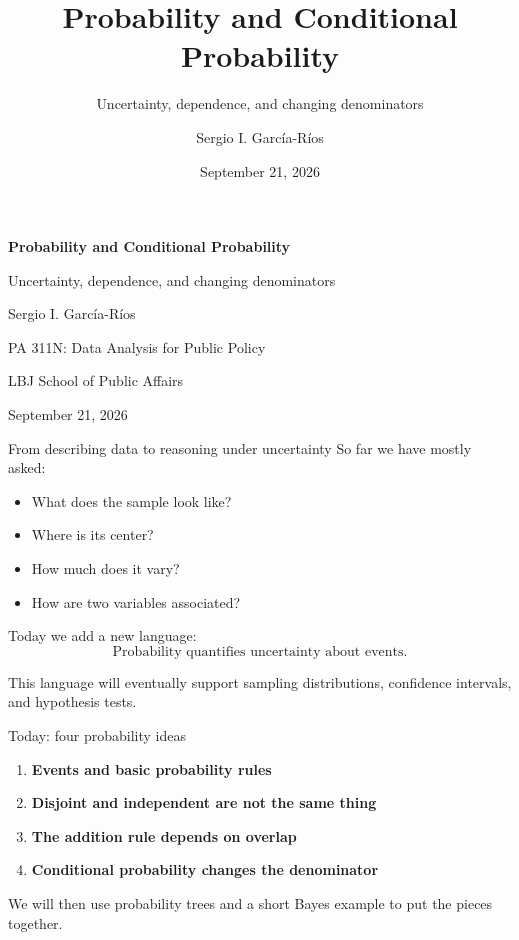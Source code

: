 \documentclass[11pt,aspectratio=169]{beamer}
\author{Sergio I. Garc\'ia-R\'ios}
\title{Probability and Conditional Probability}
\subtitle{Uncertainty, dependence, and changing denominators}
\institute{PA 311N: Data Analysis for Public Policy\\LBJ School of Public Affairs}
\date{September 21, 2026}
\begin{document}
\begin{frame}[plain]
\centering
\vspace{0.7cm}
{\color{LBJnavy}\LARGE\bfseries Probability and Conditional Probability\par}
\vspace{0.45cm}
{\large Uncertainty, dependence, and changing denominators\par}
\vspace{1.0cm}
{\normalsize Sergio I. Garc\'ia-R\'ios\par}
\vspace{0.2cm}
{\small PA 311N: Data Analysis for Public Policy\par}
{\small LBJ School of Public Affairs\par}
\vfill
{\small September 21, 2026\par}
\end{frame}

\begin{frame}{From describing data to reasoning under uncertainty}
So far we have mostly asked:
\begin{itemize}
  \item What does the sample look like?
  \item Where is its center?
  \item How much does it vary?
  \item How are two variables associated?
\end{itemize}

\vspace{0.7em}
Today we add a new language:
\[
\boxed{\text{Probability quantifies uncertainty about events.}}
\]

\vfill
This language will eventually support sampling distributions, confidence intervals, and hypothesis tests.
\end{frame}

\begin{frame}{Today: four probability ideas}
\begin{enumerate}
  \item \textbf{Events and basic probability rules}
  \item \textbf{Disjoint and independent are not the same thing}
  \item \textbf{The addition rule depends on overlap}
  \item \textbf{Conditional probability changes the denominator}
\end{enumerate}

\vspace{0.8em}
We will then use \alert{probability trees} and a short \alert{Bayes} example to put the pieces together.
\end{frame}
\end{document}
